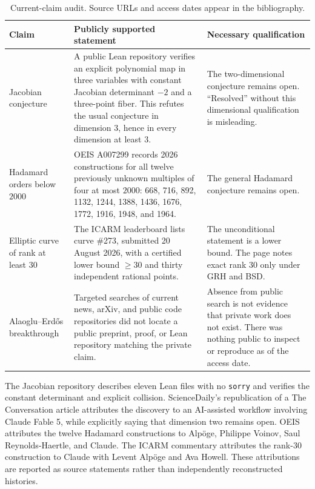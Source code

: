 \documentclass[11pt]{article}
\theoremstyle{definition}
\begin{document}
\begin{table}[htbp]
\centering
\footnotesize
\begin{tabularx}{\textwidth}{@{}
>{\raggedright\arraybackslash}p{}
>{\raggedright\arraybackslash}X
>{\raggedright\arraybackslash}p{}@{}}
\toprule
Claim & Publicly supported statement & Necessary qualification \\
\midrule
Jacobian conjecture & A public Lean repository verifies an explicit polynomial map in
three variables with constant Jacobian determinant $-2$ and a three-point fiber.  This
refutes the usual conjecture in dimension $3$, hence in every dimension at least $3$. &
The two-dimensional conjecture remains open.  ``Resolved'' without this dimensional
qualification is misleading. \\
\addlinespace
Hadamard orders below $2000$ & OEIS A007299 records 2026 constructions for all twelve
previously unknown multiples of four at most $2000$: 668, 716, 892, 1132, 1244,
1388, 1436, 1676, 1772, 1916, 1948, and 1964. & The general Hadamard conjecture remains open. \\
\addlinespace
Elliptic curve of rank at least $30$ & The ICARM leaderboard lists curve \#273, submitted
20 August 2026, with a certified lower bound $\ge30$ and thirty independent rational
points. & The unconditional statement is a lower bound.  The page notes exact rank $30$
only under GRH and BSD. \\
\addlinespace
Alaoglu--Erd\H{o}s breakthrough & Targeted searches of current news, arXiv, and public
code repositories did not locate a public preprint, proof, or Lean repository matching
the private claim. & Absence from public search is not evidence that private work does not
exist.  There was nothing public to inspect or reproduce as of the access date. \\
\bottomrule
\end{tabularx}
\caption{Current-claim audit.  Source URLs and access dates appear in the bibliography.}
\label{tab:current-claims}
\end{table}

The Jacobian repository describes eleven Lean files with no \texttt{sorry} and verifies the
constant determinant and explicit collision.  ScienceDaily's republication of a
The Conversation article attributes the discovery to an AI-assisted workflow involving
Claude Fable 5, while explicitly saying that dimension two remains open.  OEIS attributes
the twelve Hadamard constructions to Alp\"oge, Philippe Voinov, Saul Reynolds-Haertle, and
Claude.  The ICARM commentary attributes the rank-$30$ construction to Claude with Levent
Alp\"oge and Ava Howell.  These attributions are reported as source statements rather than
independently reconstructed histories.
\end{document}
